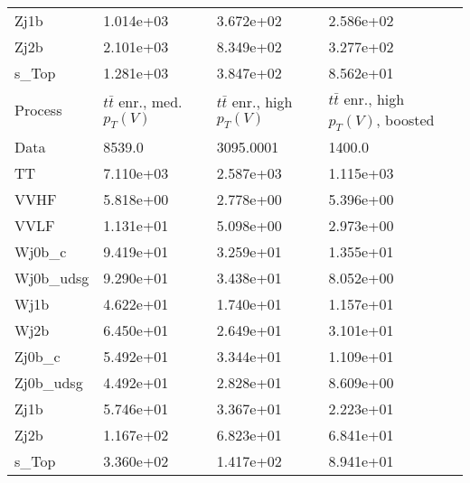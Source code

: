 \begin{table}
{\begin{tabularx}{0.8\textwidth}{|X|X|X|X|}
Zj1b & 1.014e+03 & 3.672e+02 & 2.586e+02 \\
Zj2b & 2.101e+03 & 8.349e+02 & 3.277e+02 \\
s\_Top & 1.281e+03 & 3.847e+02 & 8.562e+01 \\
\hline
\hline
Process & $t\bar{t}$ enr., med. $p_{T}(V)$ & $t\bar{t}$ enr., high $p_{T}(V)$ & $t\bar{t}$ enr., high $p_{T}(V)$, boosted \\
\hline
Data & 8539.0 & 3095.0001 & 1400.0 \\
\hline
TT & 7.110e+03 & 2.587e+03 & 1.115e+03 \\
VVHF & 5.818e+00 & 2.778e+00 & 5.396e+00 \\
VVLF & 1.131e+01 & 5.098e+00 & 2.973e+00 \\
Wj0b\_c & 9.419e+01 & 3.259e+01 & 1.355e+01 \\
Wj0b\_udsg & 9.290e+01 & 3.438e+01 & 8.052e+00 \\
Wj1b & 4.622e+01 & 1.740e+01 & 1.157e+01 \\
Wj2b & 6.450e+01 & 2.649e+01 & 3.101e+01 \\
Zj0b\_c & 5.492e+01 & 3.344e+01 & 1.109e+01 \\
Zj0b\_udsg & 4.492e+01 & 2.828e+01 & 8.609e+00 \\
Zj1b & 5.746e+01 & 3.367e+01 & 2.223e+01 \\
Zj2b & 1.167e+02 & 6.823e+01 & 6.841e+01 \\
s\_Top & 3.360e+02 & 1.417e+02 & 8.941e+01 \\
\hline
\end{tabularx}
}
\label{tab:cr-Znn-2017}
\end{table}


